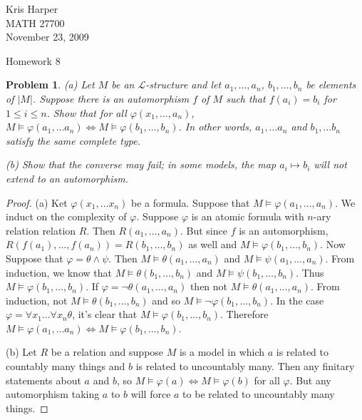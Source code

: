 \documentclass{article}
\newtheorem{problem}{Problem}
\begin{document}
\begin{flushright}
Kris Harper\\

MATH 27700\\

November 23, 2009
\end{flushright}

\begin{center}
Homework 8
\end{center}

\begin{problem}
(a) Let $M$ be an $\mathcal{L}$-structure and let $a_1, \dots , a_n$, $b_1, \dots , b_n$ be elements of $|M|$. Suppose there is an automorphism $f$ of $M$ such that $f(a_i) = b_i$ for $1 \leq i \leq n$. Show that for all $\varphi(x_1, \dots , a_n)$, $M \models \varphi(a_1, \dots a_n) \iff M \models \varphi(b_1, \dots , b_n)$. In other words, $a_1, \dots a_n$ and $b_1, \dots b_n$ satisfy the same complete type.

(b) Show that the converse may fail; in some models, the map $a_i \mapsto b_i$ will not extend to an automorphism.
\end{problem}
\begin{proof}
(a) Ket $\varphi(x_1, \dots x_n)$ be a formula. Suppose that $M \models \varphi(a_1, \dots , a_n)$. We induct on the complexity of $\varphi$. Suppose $\varphi$ is an atomic formula with $n$-ary relation relation $R$. Then $R(a_1, \dots , a_n)$. But since $f$ is an automorphism, $R(f(a_1), \dots , f(a_n)) = R(b_1, \dots , b_n)$ as well and $M \models \varphi(b_1, \dots , b_n)$. Now Suppose that $\varphi = \theta \wedge \psi$. Then $M \models \theta(a_1, \dots , a_n)$ and $M \models \psi(a_1, \dots , a_n)$. From induction, we know that $M \models \theta(b_1, \dots , b_n)$ and $M \models \psi(b_1, \dots , b_n)$. Thus $M \models \varphi(b_1, \dots , b_n)$. If $\varphi = \neg \theta(a_1, \dots , a_n)$ then not $M \models \theta(a_1, \dots , a_n)$. From induction, not $M \models \theta(b_1, \dots , b_n)$ and so $M \models \neg \varphi(b_1, \dots , b_n)$. In the case $\varphi = \forall x_1 \dots \forall x_n \theta$, it's clear that $M \models \varphi(b_1, \dots , b_n)$. Therefore $M \models \varphi(a_1, \dots a_n) \iff M \models \varphi(b_1, \dots , b_n)$.

(b) Let $R$ be a relation and suppose $M$ is a model in which $a$ is related to countably many things and $b$ is related to uncountably many. Then any finitary statements about $a$ and $b$, so $M \models \varphi(a) \iff M \models \varphi(b)$ for all $\varphi$. But any automorphism taking $a$ to $b$ will force $a$ to be related to uncountably many things.
\end{proof}
\end{document}
